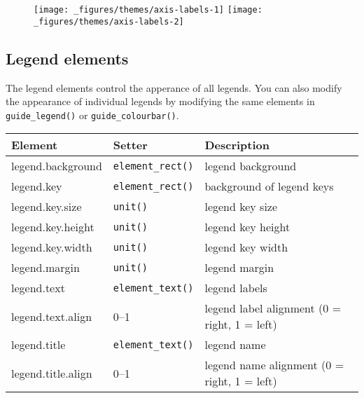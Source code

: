 \begin{Shaded}
\begin{Highlighting}[]
\StringTok{ }\NormalTok{(}
   \NormalTok{(}\NormalTok{, }\NormalTok{, }\NormalTok{), }
   \NormalTok{:}
\NormalTok{)}
\StringTok{ }\StringTok{ }\NormalTok{()}
\StringTok{ }
\StringTok{  }\NormalTok{(} \NormalTok{(} \NormalTok{-}\NormalTok{, } \NormalTok{, } \NormalTok{)) +}\StringTok{ }
\StringTok{  }\NormalTok{(}\NormalTok{) +}\StringTok{ }
\StringTok{  }\NormalTok{(}\NormalTok{)}
\end{Highlighting}
\end{Shaded}

\begin{figure}[H]
  \texttt{[image: \_figures/themes/axis-labels-1]}%
  \texttt{[image: \_figures/themes/axis-labels-2]}
\end{figure}

\subsection{Legend elements}

 

The legend elements control the apperance of all legends. You can also
modify the appearance of individual legends by modifying the same
elements in \texttt{guide\_legend()} or \texttt{guide\_colourbar()}.

\begin{longtable}[c]{@{}lll@{}}
\toprule
Element & Setter & Description\tabularnewline
\midrule
\endhead
legend.background & \texttt{element\_rect()} & legend
background\tabularnewline
legend.key & \texttt{element\_rect()} & background of legend
keys\tabularnewline
legend.key.size & \texttt{unit()} & legend key size\tabularnewline
legend.key.height & \texttt{unit()} & legend key height\tabularnewline
legend.key.width & \texttt{unit()} & legend key width\tabularnewline
legend.margin & \texttt{unit()} & legend margin\tabularnewline
legend.text & \texttt{element\_text()} & legend labels\tabularnewline
legend.text.align & 0--1 & legend label alignment (0 = right, 1 =
left)\tabularnewline
legend.title & \texttt{element\_text()} & legend name\tabularnewline
legend.title.align & 0--1 & legend name alignment (0 = right, 1 =
left)\tabularnewline
\bottomrule
\end{longtable}

